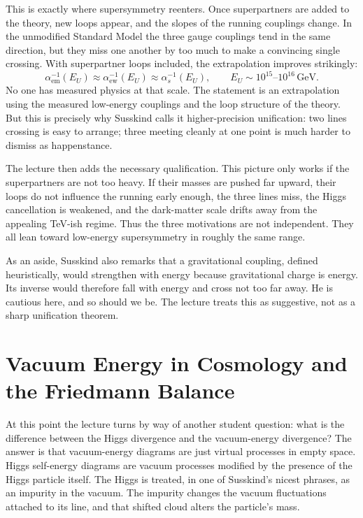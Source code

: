 This is exactly where supersymmetry reenters. Once superpartners are added to the theory, new loops appear, and the slopes of the running couplings change. In the unmodified Standard Model the three gauge couplings tend in the same direction, but they miss one another by too much to make a convincing single crossing. With superpartner loops included, the extrapolation improves strikingly:
\begin{equation}
\alpha_{\mathrm{em}}^{-1}(E_U)\approx
\alpha_{\mathrm{ew}}^{-1}(E_U)\approx
\alpha_s^{-1}(E_U),
\qquad
E_U\sim 10^{15}\text{--}10^{16}\,\mathrm{GeV}.
\end{equation}
No one has measured physics at that scale. The statement is an extrapolation using the measured low-energy couplings and the loop structure of the theory. But this is precisely why Susskind calls it higher-precision unification: two lines crossing is easy to arrange; three meeting cleanly at one point is much harder to dismiss as happenstance.

The lecture then adds the necessary qualification. This picture only works if the superpartners are not too heavy. If their masses are pushed far upward, their loops do not influence the running early enough, the three lines miss, the Higgs cancellation is weakened, and the dark-matter scale drifts away from the appealing TeV-ish regime. Thus the three motivations are not independent. They all lean toward low-energy supersymmetry in roughly the same range.

As an aside, Susskind also remarks that a gravitational coupling, defined heuristically, would strengthen with energy because gravitational charge is energy. Its inverse would therefore fall with energy and cross not too far away. He is cautious here, and so should we be. The lecture treats this as suggestive, not as a sharp unification theorem.

\section{Vacuum Energy in Cosmology and the Friedmann Balance}

At this point the lecture turns by way of another student question: what is the difference between the Higgs divergence and the vacuum-energy divergence? The answer is that vacuum-energy diagrams are just virtual processes in empty space. Higgs self-energy diagrams are vacuum processes modified by the presence of the Higgs particle itself. The Higgs is treated, in one of Susskind's nicest phrases, as an impurity in the vacuum. The impurity changes the vacuum fluctuations attached to its line, and that shifted cloud alters the particle's mass.

